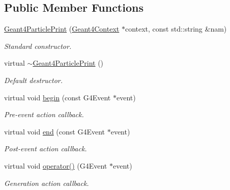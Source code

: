\subsection*{Public Member Functions}
\begin{DoxyCompactItemize}
\item 
\hyperlink{class_d_d4hep_1_1_simulation_1_1_geant4_particle_print_a58c9b621de94baca62700ae958afc596}{Geant4ParticlePrint} (\hyperlink{class_d_d4hep_1_1_simulation_1_1_geant4_context}{Geant4Context} $\ast$context, const std::string \&nam)
\begin{DoxyCompactList}\small\item\em Standard constructor. \item\end{DoxyCompactList}\item 
virtual \hyperlink{class_d_d4hep_1_1_simulation_1_1_geant4_particle_print_a6a9afd3df558e060f8bb32db26de8433}{$\sim$Geant4ParticlePrint} ()
\begin{DoxyCompactList}\small\item\em Default destructor. \item\end{DoxyCompactList}\item 
virtual void \hyperlink{class_d_d4hep_1_1_simulation_1_1_geant4_particle_print_ad1a3cbd1ef6837aa2bccb3b01c415d8f}{begin} (const G4Event $\ast$event)
\begin{DoxyCompactList}\small\item\em Pre-\/event action callback. \item\end{DoxyCompactList}\item 
virtual void \hyperlink{class_d_d4hep_1_1_simulation_1_1_geant4_particle_print_ad2ba85711f58068667eb94d1f6b80012}{end} (const G4Event $\ast$event)
\begin{DoxyCompactList}\small\item\em Post-\/event action callback. \item\end{DoxyCompactList}\item 
virtual void \hyperlink{class_d_d4hep_1_1_simulation_1_1_geant4_particle_print_a6aa380c89db0f6359ba163e196b50938}{operator()} (G4Event $\ast$event)
\begin{DoxyCompactList}\small\item\em Generation action callback. \item\end{DoxyCompactList}\end{DoxyCompactItemize}
